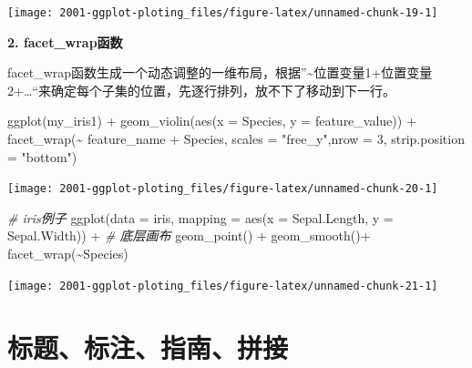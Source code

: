 \documentclass[
]{book}
\newenvironment{Shaded}{\begin{snugshade}}{\end{snugshade}}
\newcommand{\AttributeTok}[1]{\textcolor[rgb]{0.77,0.63,0.00}{#1}}
\newcommand{\CommentTok}[1]{\textcolor[rgb]{0.56,0.35,0.01}{\textit{#1}}}
\newcommand{\DecValTok}[1]{\textcolor[rgb]{0.00,0.00,0.81}{#1}}
\newcommand{\FunctionTok}[1]{\textcolor[rgb]{0.00,0.00,0.00}{#1}}
\newcommand{\NormalTok}[1]{#1}
\newcommand{\SpecialCharTok}[1]{\textcolor[rgb]{0.00,0.00,0.00}{#1}}
\newcommand{\StringTok}[1]{\textcolor[rgb]{0.31,0.60,0.02}{#1}}
\begin{document}
\begin{center}\texttt{[image: 2001-ggplot-ploting\_files/figure-latex/unnamed-chunk-19-1]} \end{center}

\textbf{2. facet\_wrap函数}

facet\_wrap函数生成一个动态调整的一维布局，根据''\textasciitilde 位置变量1+位置变量2+\ldots``来确定每个子集的位置，先逐行排列，放不下了移动到下一行。

\begin{Shaded}
\begin{Highlighting}[]
\FunctionTok{ggplot}\NormalTok{(my\_iris1) }\SpecialCharTok{+}
  \FunctionTok{geom\_violin}\NormalTok{(}\FunctionTok{aes}\NormalTok{(}\AttributeTok{x =}\NormalTok{ Species, }\AttributeTok{y =}\NormalTok{ feature\_value)) }\SpecialCharTok{+}
  \FunctionTok{facet\_wrap}\NormalTok{(}\SpecialCharTok{\textasciitilde{}}\NormalTok{ feature\_name }\SpecialCharTok{+}\NormalTok{ Species, }\AttributeTok{scales =} \StringTok{"free\_y"}\NormalTok{,}\AttributeTok{nrow =} \DecValTok{3}\NormalTok{,}
             \AttributeTok{strip.position =} \StringTok{"bottom"}\NormalTok{)}
\end{Highlighting}
\end{Shaded}

\begin{center}\texttt{[image: 2001-ggplot-ploting\_files/figure-latex/unnamed-chunk-20-1]} \end{center}

\begin{Shaded}
\begin{Highlighting}[]
\CommentTok{\# iris例子}
\FunctionTok{ggplot}\NormalTok{(}\AttributeTok{data =}\NormalTok{ iris, }\AttributeTok{mapping =} \FunctionTok{aes}\NormalTok{(}\AttributeTok{x =}\NormalTok{ Sepal.Length, }\AttributeTok{y =}\NormalTok{ Sepal.Width)) }\SpecialCharTok{+}  \CommentTok{\# 底层画布}
  \FunctionTok{geom\_point}\NormalTok{() }\SpecialCharTok{+}
  \FunctionTok{geom\_smooth}\NormalTok{()}\SpecialCharTok{+}
  \FunctionTok{facet\_wrap}\NormalTok{(}\SpecialCharTok{\textasciitilde{}}\NormalTok{Species)}
\end{Highlighting}
\end{Shaded}

\begin{center}\texttt{[image: 2001-ggplot-ploting\_files/figure-latex/unnamed-chunk-21-1]} \end{center}

\hypertarget{ux6807ux9898ux6807ux6ce8ux6307ux5357ux62fcux63a5}{%
\section{标题、标注、指南、拼接}\label{ux6807ux9898ux6807ux6ce8ux6307ux5357ux62fcux63a5}}
\end{document}
